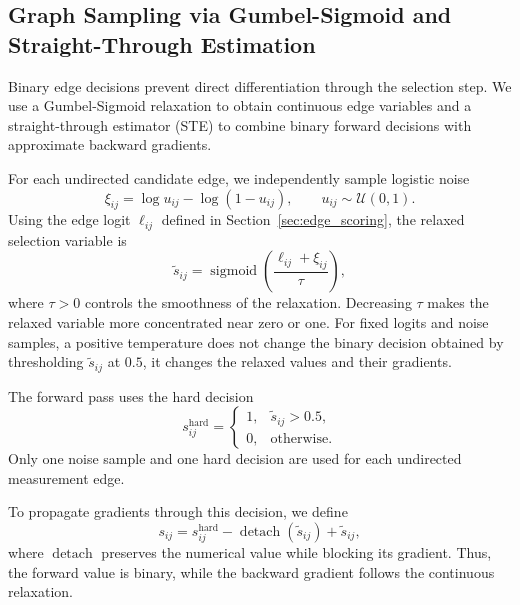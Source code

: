 \subsection{Graph Sampling via Gumbel-Sigmoid and Straight-Through Estimation}
\label{sec:graph_sampling}
Binary edge decisions prevent direct differentiation through the selection step. We use a Gumbel-Sigmoid relaxation to obtain continuous edge variables and a straight-through estimator (STE) to combine binary forward decisions with approximate backward gradients.

For each undirected candidate edge, we independently sample logistic noise
\[
    \xi_{ij}
    =
    \log u_{ij}-\log(1-u_{ij}),
    \qquad
    u_{ij}\sim\mathcal U(0,1).
\]
Using the edge logit $\ell_{ij}$ defined in Section~\ref{sec:edge_scoring}, the relaxed selection variable is
\begin{equation}
    \tilde s_{ij}
    =
    \operatorname{sigmoid}
    \left(
    \frac{\ell_{ij}+\xi_{ij}}{\tau}
    \right),
    \label{eq:continuous_relaxation}
\end{equation}
where $\tau>0$ controls the smoothness of the relaxation. Decreasing $\tau$ makes the relaxed variable more concentrated near zero or one. For fixed logits and noise samples, a positive temperature does not change the binary decision obtained by thresholding $\tilde s_{ij}$ at $0.5$, it changes the relaxed values and their gradients.

The forward pass uses the hard decision
\begin{equation}
    s_{ij}^{\mathrm{hard}}
    =
    \begin{cases}
        1, & \tilde s_{ij}>0.5,\\
        0, & \text{otherwise}.
    \end{cases}
    \label{eq:forward_hard}
\end{equation}
Only one noise sample and one hard decision are used for each undirected measurement edge.

To propagate gradients through this decision, we define
\begin{equation}
    s_{ij}
    =
    s_{ij}^{\mathrm{hard}}
    -
    \operatorname{detach}(\tilde s_{ij})
    +
    \tilde s_{ij},
    \label{eq:backward_ste}
\end{equation}
where $\operatorname{detach}$ preserves the numerical value while blocking its gradient. Thus, the forward value is binary, while the backward gradient follows the continuous relaxation.


